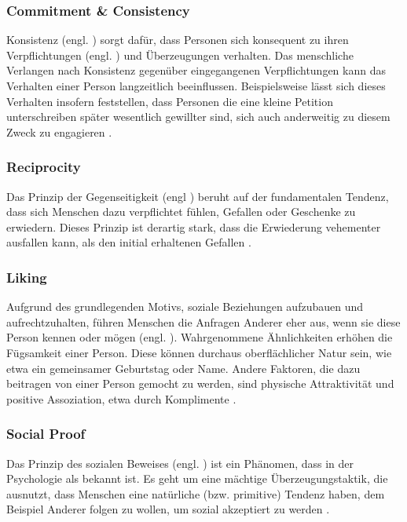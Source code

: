 \subsubsection{Commitment \& Consistency}
Konsistenz (engl. ) sorgt dafür, dass Personen sich konsequent zu ihren Verpflichtungen (engl. ) und Überzeugungen verhalten.
Das menschliche Verlangen nach Konsistenz gegenüber eingegangenen Verpflichtungen kann das Verhalten einer Person langzeitlich beeinflussen.
Beispielsweise lässt sich dieses Verhalten insofern feststellen, dass Personen die eine kleine Petition unterschreiben später wesentlich gewillter sind, sich auch anderweitig zu diesem Zweck zu engagieren .

\subsubsection{Reciprocity}
Das Prinzip der Gegenseitigkeit (engl ) beruht auf der fundamentalen Tendenz, dass sich Menschen dazu verpflichtet fühlen, Gefallen oder Geschenke zu erwiedern.
Dieses Prinzip ist derartig stark, dass die Erwiederung vehementer ausfallen kann, als den initial erhaltenen Gefallen .

\subsubsection{Liking}
Aufgrund des grundlegenden Motivs, soziale Beziehungen aufzubauen und aufrechtzuhalten, führen Menschen die Anfragen Anderer eher aus, wenn sie diese Person kennen oder mögen (engl. ).
Wahrgenommene Ähnlichkeiten erhöhen die Fügsamkeit einer Person. Diese können durchaus oberflächlicher Natur sein, wie etwa ein gemeinsamer Geburtstag oder Name.
Andere Faktoren, die dazu beitragen von einer Person gemocht zu werden, sind physische Attraktivität und positive Assoziation, etwa durch Komplimente .

\subsubsection{Social Proof}
Das Prinzip des sozialen Beweises (engl. ) ist ein Phänomen, dass in der Psychologie als  bekannt ist.
Es geht um eine mächtige Überzeugungstaktik, die ausnutzt, dass Menschen eine natürliche (bzw. primitive) Tendenz haben, dem Beispiel Anderer folgen zu wollen, um sozial akzeptiert zu werden .

